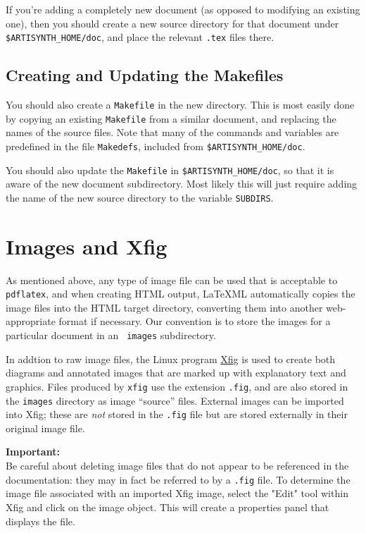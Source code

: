 \documentclass{article}
\begin{document}
If you're adding a completely new document (as opposed
to modifying an existing one), then you should create a
new source directory for that document under {\tt \$ARTISYNTH\_HOME/doc},
and place the relevant {\tt .tex} files there.

\subsection{Creating and Updating the Makefiles}

You should also create a {\tt Makefile} in the new directory. This is most
easily done by copying an existing {\tt Makefile} from a similar document,
and replacing the names of the source files. 
Note that many of the commands
and variables are predefined in the file {\tt Makedefs}, included from
{\tt \$ARTISYNTH\_HOME/doc}.

You should also update the {\tt Makefile} in {\tt \$ARTISYNTH\_HOME/doc},
so that it is aware of the new document subdirectory. Most
likely this will just require adding the name of the new source
directory to the variable {\tt SUBDIRS}.

\section{Images and Xfig}
\label{ImagesSec}

As mentioned above, any type of image file can be used that is
acceptable to {\tt pdflatex}, and when creating HTML output, LaTeXML
automatically copies the image files into the HTML target directory,
converting them into another web-appropriate format if necessary.  Our
convention is to store the images for a particular document in an {\tt
images} subdirectory.

In addtion to raw image files, the Linux program
\href{http://www.xfig.org}{Xfig} is used to create both diagrams and
annotated images that are marked up with explanatory text and
graphics.  Files produced by {\tt xfig} use the extension {\tt .fig},
and are also stored in the {\tt images} directory as image ``source''
files.  External images can be imported into Xfig; these are {\it not}
stored in the {\tt .fig} file but are stored externally in their
original image file.

\begin{sideblock}
{\bf Important:}\\ Be careful about deleting image files that do not
appear to be referenced in the documentation: they may in fact be
referred to by a {\tt .fig} file.  To determine the image file
associated with an imported Xfig image, select the "Edit" tool within
Xfig and click on the image object.  This will create a properties
panel that displays the file.
\end{sideblock}
\end{document}
